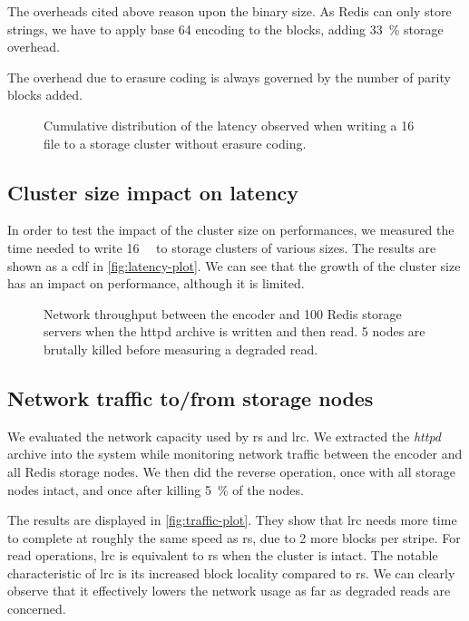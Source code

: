 The overheads cited above reason upon the binary size.
As Redis can only store strings, we have to apply base 64 encoding to the blocks, adding \SI{33}{\percent} storage overhead.

The overhead due to erasure coding is always governed by the number of parity blocks added.

\begin{figure}
    \centering
    
    \caption{Cumulative distribution of the latency observed when writing a \SI{16}{\mebi\byte} file to a storage cluster without erasure coding.}
    \label{fig:latency-plot}
\end{figure}

\subsection{Cluster size impact on latency}
\label{subsec:latency}

In order to test the impact of the cluster size on performances, we measured the time needed to write \SI{16}{\mebi\byte} to storage clusters of various sizes.
The results are shown as a \ac{cdf} in \autoref{fig:latency-plot}.
We can see that the growth of the cluster size has an impact on performance, although it is limited.

\begin{figure*}
    \centering
    
    \caption{Network throughput between the encoder and 100 Redis storage servers when the httpd archive is written and then read. 5 nodes are brutally killed before measuring a degraded read.}
    \label{fig:traffic-plot}
\end{figure*}

\subsection{Network traffic to/from storage nodes}
\label{subsec:network-traffic}

We evaluated the network capacity used by \ac{rs} and \ac{lrc}.
We extracted the \textit{httpd} archive into the system while monitoring network traffic between the encoder and all Redis storage nodes.
We then did the reverse operation, once with all storage nodes intact, and once after killing \SI{5}{\percent} of the nodes.

The results are displayed in \autoref{fig:traffic-plot}.
They show that \ac{lrc} needs more time to complete at roughly the same speed as \ac{rs}, due to 2 more blocks per stripe.
For read operations, \ac{lrc} is equivalent to \ac{rs} when the cluster is intact.
The notable characteristic of \ac{lrc} is its increased block locality compared to \ac{rs}.
We can clearly observe that it effectively lowers the network usage as far as degraded reads are concerned.

